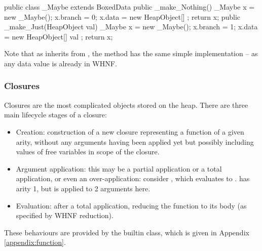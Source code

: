 \documentclass[dissertation.tex]{subfiles}
\begin{document}
{{{            \begin{javafigure}
            public class _Maybe extends BoxedData {
                public _make_Nothing() {
                    _Maybe x = new _Maybe();
                    x.branch = 0;
                    x.data = new HeapObject[] {};
                    return x;
                }
                public _make_Just(HeapObject val) {
                    _Maybe x = new _Maybe();
                    x.branch = 1;
                    x.data = new HeapObject[] { val };
                    return x;
                }
            }
            \end{javafigure}

            Note that as  inherits from , the  method has the same simple implementation -- as any data value is already in WHNF.
        }
        \subsubsection{Closures}\label{sec:closures}
        {
            Closures are the most complicated objects stored on the heap. There are three main lifecycle stages of a closure:

            \begin{itemize}
            \item
            {
                Creation: construction of a new closure representing a function of a given arity, without any arguments having been applied yet but possibly including values of free variables in scope of the closure.
            }
            \item
            {
                Argument application: this may be a partial application or a total application, or even an over-application: consider , which evaluates to .  has arity 1, but is applied to 2 arguments here.
            }
            \item
            {
                Evaluation: after a total application, reducing the function to its body (as specified by WHNF reduction).
            }
            \end{itemize}

            These behaviours are provided by the  builtin class, which is given in Appendix \ref{appendix:function}.


}}}
\end{document}
